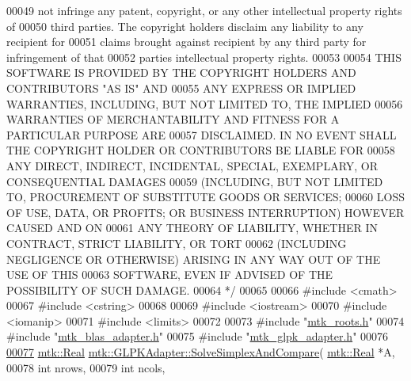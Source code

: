 \begin{DoxyCode}
00049 \textcolor{comment}{not infringe any patent, copyright, or any other intellectual property rights of}
00050 \textcolor{comment}{third parties. The copyright holders disclaim any liability to any recipient for}
00051 \textcolor{comment}{claims brought against recipient by any third party for infringement of that}
00052 \textcolor{comment}{parties intellectual property rights.}
00053 \textcolor{comment}{}
00054 \textcolor{comment}{THIS SOFTWARE IS PROVIDED BY THE COPYRIGHT HOLDERS AND CONTRIBUTORS "AS IS" AND}
00055 \textcolor{comment}{ANY EXPRESS OR IMPLIED WARRANTIES, INCLUDING, BUT NOT LIMITED TO, THE IMPLIED}
00056 \textcolor{comment}{WARRANTIES OF MERCHANTABILITY AND FITNESS FOR A PARTICULAR PURPOSE ARE}
00057 \textcolor{comment}{DISCLAIMED. IN NO EVENT SHALL THE COPYRIGHT HOLDER OR CONTRIBUTORS BE LIABLE FOR}
00058 \textcolor{comment}{ANY DIRECT, INDIRECT, INCIDENTAL, SPECIAL, EXEMPLARY, OR CONSEQUENTIAL DAMAGES}
00059 \textcolor{comment}{(INCLUDING, BUT NOT LIMITED TO, PROCUREMENT OF SUBSTITUTE GOODS OR SERVICES;}
00060 \textcolor{comment}{LOSS OF USE, DATA, OR PROFITS; OR BUSINESS INTERRUPTION) HOWEVER CAUSED AND ON}
00061 \textcolor{comment}{ANY THEORY OF LIABILITY, WHETHER IN CONTRACT, STRICT LIABILITY, OR TORT}
00062 \textcolor{comment}{(INCLUDING NEGLIGENCE OR OTHERWISE) ARISING IN ANY WAY OUT OF THE USE OF THIS}
00063 \textcolor{comment}{SOFTWARE, EVEN IF ADVISED OF THE POSSIBILITY OF SUCH DAMAGE.}
00064 \textcolor{comment}{*/}
00065 
00066 \textcolor{preprocessor}{#include <cmath>}
00067 \textcolor{preprocessor}{#include <cstring>}
00068 
00069 \textcolor{preprocessor}{#include <iostream>}
00070 \textcolor{preprocessor}{#include <iomanip>}
00071 \textcolor{preprocessor}{#include <limits>}
00072 
00073 \textcolor{preprocessor}{#include "\hyperlink{mtk__roots_8h}{mtk\_roots.h}"}
00074 \textcolor{preprocessor}{#include "\hyperlink{mtk__blas__adapter_8h}{mtk\_blas\_adapter.h}"}
00075 \textcolor{preprocessor}{#include "\hyperlink{mtk__glpk__adapter_8h}{mtk\_glpk\_adapter.h}"}
00076 
\hypertarget{mtk__glpk__adapter_8cc_source_l00077}{}\hyperlink{classmtk_1_1GLPKAdapter_a0c9ebb125445bc5af752bf4fb47f44b2}{00077} \hyperlink{group__c01-roots_gac080bbbf5cbb5502c9f00405f894857d}{mtk::Real} \hyperlink{classmtk_1_1GLPKAdapter_a0c9ebb125445bc5af752bf4fb47f44b2}{mtk::GLPKAdapter::SolveSimplexAndCompare}(
      \hyperlink{group__c01-roots_gac080bbbf5cbb5502c9f00405f894857d}{mtk::Real} *A,
00078                                                    \textcolor{keywordtype}{int} nrows,
00079                                                    \textcolor{keywordtype}{int} ncols,

\end{DoxyCode}
